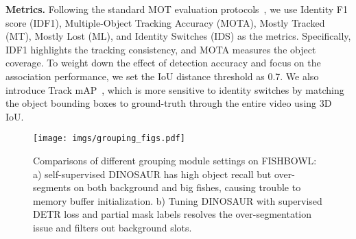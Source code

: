 \vspace{+2.5mm}
\noindent\textbf{Metrics.} Following the standard MOT evaluation protocols~\cite{ristani2016performance, milan2016mot16}, we use Identity F1 score (IDF1), Multiple-Object Tracking Accuracy (MOTA), Mostly Tracked (MT), Mostly Lost (ML), and Identity Switches (IDS) as the metrics. Specifically, IDF1 highlights the tracking consistency, and MOTA measures the  object coverage. To weight down the effect of detection accuracy and focus on the association performance, we set the IoU distance threshold as 0.7.
We also introduce Track mAP~\cite{dave2020tao}, which is more sensitive to identity switches by matching the object bounding boxes to ground-truth through the entire video using 3D IoU. 
 
\begin{figure}[!t]
    \centering	\texttt{[image: imgs/grouping\_figs.pdf]}
\caption{Comparisons of different grouping module settings on FISHBOWL: a) self-supervised DINOSAUR has high object recall but over-segments on both background and big fishes, causing trouble to memory buffer initialization. b) Tuning DINOSAUR with supervised DETR loss and partial mask labels resolves the over-segmentation issue and filters out background slots. 
 }
\label{fig:group}
\end{figure}

